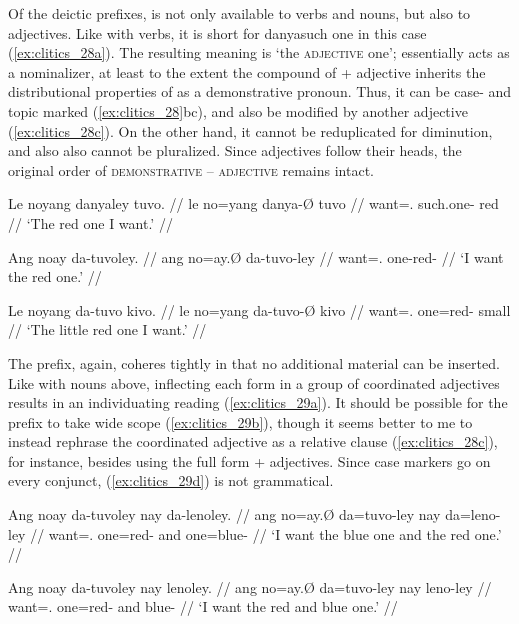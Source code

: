 Of the deictic prefixes,  is not only available to verbs and
nouns, but also to adjectives. Like with verbs, it is short for 
{danya}{such one} in this case (\ref{ex:clitics_28a}). The resulting meaning is
`the \textsc{adjective} one';  essentially acts as a nominalizer,
at least to the extent the compound of  + adjective inherits the
distributional properties of  as a demonstrative pronoun.
Thus, it can be case- and topic marked (\ref{ex:clitics_28}bc), and also be
modified by another adjective (\ref{ex:clitics_28c}). On the other hand, it
cannot be reduplicated for diminution, and also also cannot be pluralized.
Since adjectives follow their heads, the original order of
\textsc{demonstrative} -- \textsc{adjective} remains intact.

\pex\label{ex:clitics_28}
\a\label{ex:clitics_28a}\begingl
	\gla Le noyang danyaley tuvo. //
	\glb le no=yang danya-Ø tuvo //
	\glc \PatTI{} want=\Fsg{}.\Aarg{} such.one-\Top{} red //
	\glft `The red one I want.' //
\endgl

\a\label{ex:clitics_28b}\begingl
	\gla Ang noay da-tuvoley. //
	\glb ang no=ay.Ø da-tuvo-ley //
	\glc \AgtT{} want=\Fsg{}.\Top{} one-red-\PargI{} //
	\glft `I want the red one.' //
\endgl

\a\label{ex:clitics_28c}\begingl
	\gla Le noyang da-tuvo kivo. //
	\glb le no=yang da-tuvo-Ø kivo //
	\glc \PatTI{} want=\Fsg{}.\Aarg{} one=red-\Top{} small //
	\glft `The little red one I want.' //
\endgl
\xe

The prefix, again, coheres tightly in that no additional material can be
inserted. Like with nouns above, inflecting each form in a group of coordinated
adjectives results in an individuating reading (\ref{ex:clitics_29a}). It
should be possible for the prefix to take wide scope (\ref{ex:clitics_29b}),
though it seems better to me to instead rephrase the coordinated adjective as a
relative clause (\ref{ex:clitics_28c}), for instance, besides using the full
form  + adjectives. Since case markers go on every conjunct,
(\ref{ex:clitics_29d}) is not grammatical.

\pex\label{ex:clitics_29}
\a\label{ex:clitics_29a}\begingl
	\gla Ang noay da-tuvoley nay da-lenoley. //
	\glb ang no=ay.Ø da=tuvo-ley nay da=leno-ley //
	\glc \AgtT{} want=\Fsg{}.\Top{} one=red-\PargI{} and one=blue-\PargI{} //
	\glft `I want the blue one and the red one.' //
\endgl

\a\label{ex:clitics_29b}\begingl
	\gla Ang noay da-tuvoley nay lenoley. //
	\glb ang no=ay.Ø da=tuvo-ley nay leno-ley //
	\glc \AgtT{} want=\Fsg{}.\Top{} one=red-\PargI{} and blue-\PargI{} //
	\glft `I want the red and blue one.' //
\endgl

